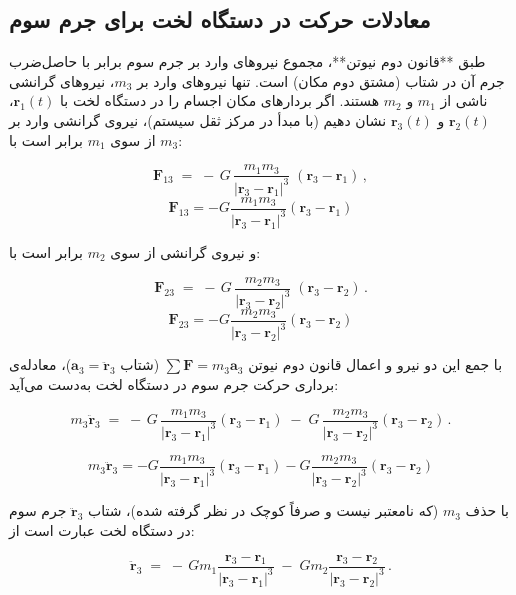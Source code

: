 \subsection{معادلات حرکت در دستگاه لخت برای جرم سوم}

طبق **قانون دوم نیوتن**، مجموع نیروهای وارد بر جرم سوم برابر با حاصل‌ضرب جرم آن در شتاب (مشتق دوم مکان) است. تنها نیروهای وارد بر \(m_3\)، نیروهای گرانشی ناشی از \(m_1\) و \(m_2\) هستند. اگر بردارهای مکان اجسام را در دستگاه لخت با \(\mathbf{r}_1(t)\)، \(\mathbf{r}_2(t)\) و \(\mathbf{r}_3(t)\) نشان دهیم (با مبدأ در مرکز ثقل سیستم)، نیروی گرانشی وارد بر \(m_3\) از سوی \(m_1\) برابر است با: 

\[ 
\mathbf{F}_{13} \;=\; -\,G\,\dfrac{m_1 m_3}{|\mathbf{r}_3 - \mathbf{r}_1|^3}\;(\mathbf{r}_3 - \mathbf{r}_1)\,,
\] 
\begin{equation}
	\mathbf{F}_{13} = -G \dfrac{m_1 m_3}{|\mathbf{r}_3 - \mathbf{r}_1|^3} (\mathbf{r}_3 - \mathbf{r}_1)
\end{equation}

و نیروی گرانشی از سوی \(m_2\) برابر است با: 

\[ 
\mathbf{F}_{23} \;=\; -\,G\,\dfrac{m_2 m_3}{|\mathbf{r}_3 - \mathbf{r}_2|^3}\;(\mathbf{r}_3 - \mathbf{r}_2)\,. 
\] 
\begin{equation}
\mathbf{F}_{23} = -G \dfrac{m_2 m_3}{|\mathbf{r}_3 - \mathbf{r}_2|^3} (\mathbf{r}_3 - \mathbf{r}_2)
\end{equation}

با جمع این دو نیرو و اعمال قانون دوم نیوتن \( \sum \mathbf{F} = m_3 \mathbf{a}_3 \) (شتاب \( \mathbf{a}_3 = \ddot{\mathbf{r}}_3 \))، معادله‌ی برداری حرکت جرم سوم در دستگاه لخت به‌دست می‌آید: 

\[ 
m_3 \ddot{\mathbf{r}}_3 \;=\; -\,G\,\dfrac{m_1 m_3}{|\mathbf{r}_3 - \mathbf{r}_1|^3}(\mathbf{r}_3 - \mathbf{r}_1)\;-\;G\,\dfrac{m_2 m_3}{|\mathbf{r}_3 - \mathbf{r}_2|^3}(\mathbf{r}_3 - \mathbf{r}_2)\,. 
\] 

\begin{equation}
m_3 \ddot{\mathbf{r}}_3 = -G \dfrac{m_1 m_3}{|\mathbf{r}_3 - \mathbf{r}_1|^3} (\mathbf{r}_3 - \mathbf{r}_1) - G \dfrac{m_2 m_3}{|\mathbf{r}_3 - \mathbf{r}_2|^3} (\mathbf{r}_3 - \mathbf{r}_2)
\end{equation}



با حذف \(m_3\) (که نامعتبر نیست و صرفاً کوچک در نظر گرفته شده)، شتاب \(\ddot{\mathbf{r}}_3\) جرم سوم در دستگاه لخت عبارت است از: 

\[ 
\ddot{\mathbf{r}}_3 \;=\; -\,G m_1 \dfrac{\mathbf{r}_3 - \mathbf{r}_1}{|\mathbf{r}_3 - \mathbf{r}_1|^3}\;-\;G m_2 \dfrac{\mathbf{r}_3 - \mathbf{r}_2}{|\mathbf{r}_3 - \mathbf{r}_2|^3}\,. 
\] 

